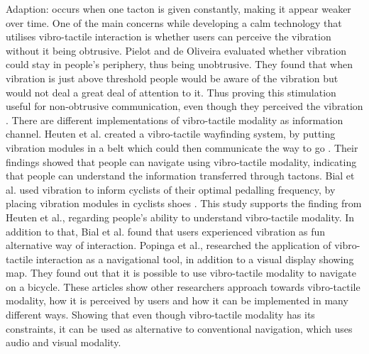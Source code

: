 \documentclass{sigchi}
\begin{document}
Adaption: occurs when one tacton is given constantly, making it appear weaker over time. 
\newline
\newline 
One of the main concerns while developing a calm technology that utilises vibro-tactile interaction is whether users can perceive the vibration without it being obtrusive. Pielot and de Oliveira evaluated whether vibration could stay in people's periphery, thus being unobtrusive. They found that when vibration is just above threshold people would be aware of the vibration but would not deal a great deal of attention to it. Thus proving this stimulation useful for non-obtrusive communication, even though they perceived the vibration \cite{pielot13}.  
\newline
\newline
There are different implementations of vibro-tactile modality as information channel. Heuten et al. created a vibro-tactile wayfinding system, by putting vibration modules in a belt which could then communicate the way to go \cite{heuten08}. Their findings showed that people can navigate using vibro-tactile modality, indicating that people can understand the information transferred through tactons. 
Bial et al. used vibration to inform cyclists of their optimal pedalling frequency, by placing vibration modules in cyclists shoes \cite{bial11}. This study supports the finding from Heuten et al., regarding people's ability to understand vibro-tactile modality. In addition to that, Bial et al. found that users experienced vibration as fun alternative way of interaction. 
\newline
\newline
Popinga et al., researched the application of vibro-tactile interaction as a navigational tool, in addition to a visual display showing map. They found out that it is possible to use vibro-tactile modality to navigate on a bicycle\cite{poppinga09}.
\newline
\newline
These articles show other researchers approach towards vibro-tactile modality, how it is perceived by users and how it can be implemented in many different ways. Showing that even though vibro-tactile modality has its constraints, it can be used as alternative to conventional navigation, which uses audio and visual modality.
\end{document}
